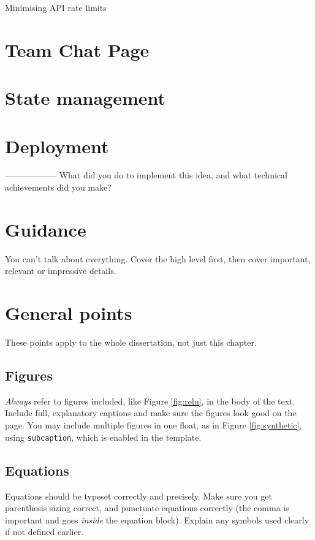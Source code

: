 \documentclass{l4proj}
\begin{document}
Minimising API rate limits


\section{Team Chat Page}


\section{State management}


\section{Deployment}

------------------
What did you do to implement this idea, and what technical achievements did you make?
\section{Guidance}
You can't talk about everything. Cover the high level first, then cover important, relevant or impressive details.



\section{General points}

These points apply to the whole dissertation, not just this chapter.



\subsection{Figures}
\emph{Always} refer to figures included, like Figure \ref{fig:relu}, in the body of the text. Include full, explanatory captions and make sure the figures look good on the page.
You may include multiple figures in one float, as in Figure \ref{fig:synthetic}, using \texttt{subcaption}, which is enabled in the template.





\clearpage

\subsection{Equations}

Equations should be typeset correctly and precisely. Make sure you get parenthesis sizing correct, and punctuate equations correctly 
(the comma is important and goes \textit{inside} the equation block). Explain any symbols used clearly if not defined earlier. 
\end{document}
